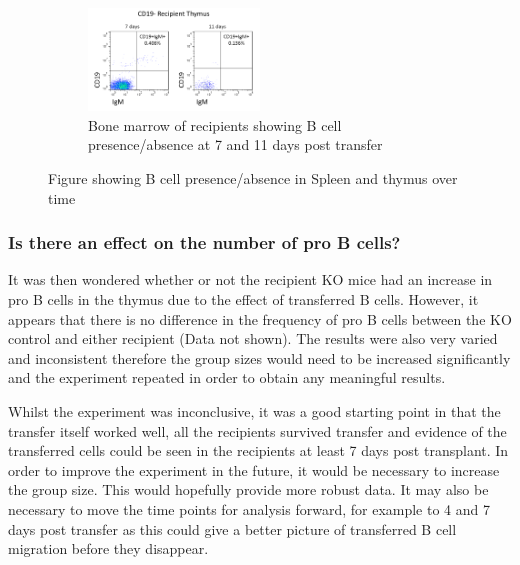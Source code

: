 \begin{figure}
\begin{subfigure}{\textwidth}
	\includegraphics[width=0.5\textwidth]{Figures/CD19negrecipthy.png}
	\caption{Bone marrow of recipients showing B cell presence/absence at 7 and 11 days post transfer}
	\end{subfigure}
\caption{Figure showing B cell presence/absence in Spleen and thymus over time}
\end{figure}


\subsubsection{Is there an effect on the number of pro B cells?}

It was then wondered whether or not the recipient KO mice had an increase in pro B cells in the thymus due to the effect of transferred B cells.
However, it appears that there is no difference in the frequency of pro B cells between the KO control and either recipient (Data not shown).
The results were also very varied and inconsistent therefore the group sizes would need to be increased significantly and the experiment repeated in order to obtain any meaningful results.

Whilst the experiment was inconclusive, it was a good starting point in that the transfer itself worked well, all the recipients survived transfer and evidence of the transferred cells could be seen in the recipients at least 7 days post transplant.
In order to improve the experiment in the future, it would be necessary to increase the group size.
This would hopefully provide more robust data.
It may also be necessary to move the time points for analysis forward, for example to 4 and 7 days post transfer as this could give a better picture of transferred B cell migration before they disappear.

